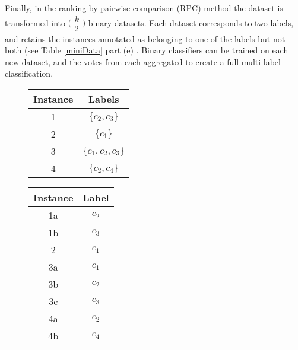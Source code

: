 \documentclass[Dissertation.tex]{subfiles}
\begin{document}
Finally, in the ranking by pairwise comparison (RPC) method	the dataset is transformed into $\bigl( \begin{smallmatrix}k\\2\end{smallmatrix}\bigr)$  binary datasets. Each dataset corresponds to two labels, and retains the instances annotated as belonging to one of the labels but not both (see Table \ref{miniData} part (e) \cite{sorowerLiteratureSurveyAlgorithms2018}. Binary classifiers can be trained on each new dataset, and the votes from each aggregated to create a full multi-label classification.

 
		
\begin{table}[]
	\centering

	\caption{Sample dataset in multi-label and label power set formats}
	\label{miniData}
	\begin{subfigure}[t]{0.25\linewidth}
		\centering
		\begin{tabular*}{1\linewidth}{@{}cc@{}}
	
			\toprule
			Instance & Labels \\ \midrule
			1	&	$ \{c_2,c_3\} $        \\
			2	&	$ \{c_1\} $        \\
			3	&	$ \{c_1,c_2,c_3\} $        \\
			4	&	$ \{c_2, c_4\} $        \\ \bottomrule
		\end{tabular*}
	\end{subfigure}
	\qquad
	\begin{subfigure}[t]{0.25\linewidth}
		\centering
		\begin{tabular*}{1\linewidth}{@{}cc@{}}
			
			\toprule
			Instance & Label \\ \midrule
			1a	&	$ c_2$      \\
			1b  &	$ c_3 $     \\
			2	&	$ c_1 $     \\
			3a	&	$ c_1$		\\
			3b	&	$ c_2$		\\
			3c	&	$ c_3$      \\
			4a	&	$ c_2$		\\
			4b 	&	$ c_4 $     \\ \bottomrule
		\end{tabular*}
	\end{subfigure}
\qquad
	\begin{subfigure}[t]{0.25\linewidth}
		\centering
		\begin{tabular*}{1\linewidth}{@{}cc@{}}
			

\end{tabular*}
\end{subfigure}
\end{table}
\end{document}
